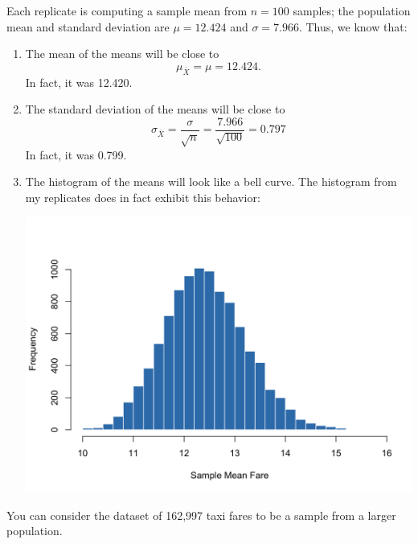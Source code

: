 \documentclass[11pt]{exam}
\begin{document}
\begin{questions}
\begin{solution}
  Each replicate is computing a sample mean from $n = 100$ samples; the
  population mean and standard deviation are $\mu = 12.424$ and $\sigma =
  7.966$. Thus, we know that:

  \begin{enumerate}
    \item The mean of the means will be close to
      \[
        \mu_{\bar X} = \mu = 12.424.
      \]
      In fact, it was 12.420.

    \item The standard deviation of the means will be close to
      \[
        \sigma_{\bar X} = \frac{\sigma}{\sqrt{n}} = \frac{7.966}{\sqrt{100}} = 0.797
      \]
      In fact, it was 0.799.

    \item The histogram of the means will look like a bell curve.
      The histogram from my replicates does in fact exhibit this behavior:

      \includegraphics[width=\linewidth]{sampmean.png}

  \end{enumerate}

\end{solution}

\vfill

\newpage

\question You can consider the dataset of 162,997 taxi fares to be a sample
from a larger population. 


\end{questions}
\end{document}
